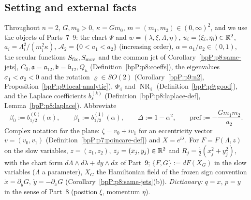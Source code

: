 \subsection{Setting and external facts}\label{bpP:p11b:sec-set}

Throughout $n=2$, $G,m_0>0$, $\kappa=Gm_0$, $m=(m_1,m_2)\in(0,\infty)^2$, and we use the objects of Parts~7--9: the chart $\Psi$ and $w=(\lambda,\xi,\Lambda,\eta)$, $u_i=(\xi_i,\eta_i)\in\mathbb{R}^2$, $a_i=\Lambda_i^2/(m_i^2\kappa)$, $\mathcal A_2=\{0<a_1<a_2\}$ (increasing order), $\alpha=a_1/a_2\in(0,1)$, the secular functions $S_{\rm fix},S_{\rm mov}$ and the common jet of Corollary~\ref{bpP:p8:same-jets}, $C_0,\mathfrak a=\mathfrak a_{12},\mathfrak b=\mathfrak b_{12},Q_h$ (Definition~\ref{bpP:p8:coeffs}), the eigenvalues $\sigma_1<\sigma_2<0$ and the rotation $\varrho\in SO(2)$ (Corollary~\ref{bpP:p9:n2}, Proposition~\ref{bpP:p9:local-analytic}), $\Phi_4$ and $\operatorname{NR}_4$ (Definition~\ref{bpP:p9:good}), and the Laplace coefficients $b_s^{(k)}$ (Definition~\ref{bpP:p8:laplace-def}, Lemma~\ref{bpP:p8:laplace}). Abbreviate
\[\beta_0:=b_{1/2}^{(0)}(\alpha),\qquad\beta_1:=b_{1/2}^{(1)}(\alpha),\qquad\Delta:=1-\alpha^2,\qquad \mathrm{pref}:=-\frac{Gm_1m_2}{a_2}.\]
Complex notation for the plane: $\zeta=v_0+iv_1$ for an eccentricity vector $v=(v_0,v_1)$ (Definition~\ref{bpP:p7:poincare-def}) and $X=e^{i\lambda}$. For $F=F(\Lambda,z)$ on the slow variables, $z=(z_1,z_2)$, $z_j=(x_j,y_j)\in\mathbb{R}^2$ and $R_j=\tfrac12(x_j^2+y_j^2)$, with the chart form $d\Lambda\wedge d\lambda+dy\wedge dx$ of Part~9; $\{F,G\}:=dF(X_G)$ in the slow variables ($\Lambda$ a parameter), $X_G$ the Hamiltonian field of the frozen sign convention $\dot x=\partial_yG,\ \dot y=-\partial_xG$ (Corollary~\ref{bpP:p8:same-jets}(b)). \emph{Dictionary:} $q=x$, $p=y$ in the sense of Part~8 (position $\xi$, momentum $\eta$).


